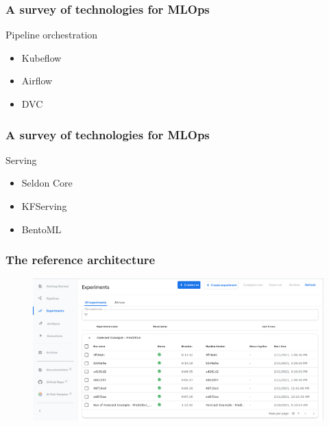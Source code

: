\documentclass{beamer}
\begin{document}
\begin{frame}
\frametitle{A survey of technologies for MLOps}

\begin{block}{Pipeline orchestration}
    \begin{itemize}
        \item Kubeflow
        \item Airflow
        \item DVC
    \end{itemize}
\end{block}

\end{frame}

\begin{frame}
\frametitle{A survey of technologies for MLOps}

\begin{block}{Serving}
    \begin{itemize}
        \item Seldon Core
        \item KFServing
        \item BentoML
    \end{itemize}
\end{block}

\end{frame}

\begin{frame}
\frametitle{The reference architecture}
\begin{figure}
\includegraphics[scale=0.40]{figure/kubeflow_prediction_pipeline.png}
\end{figure}

\end{frame}
\end{document}
